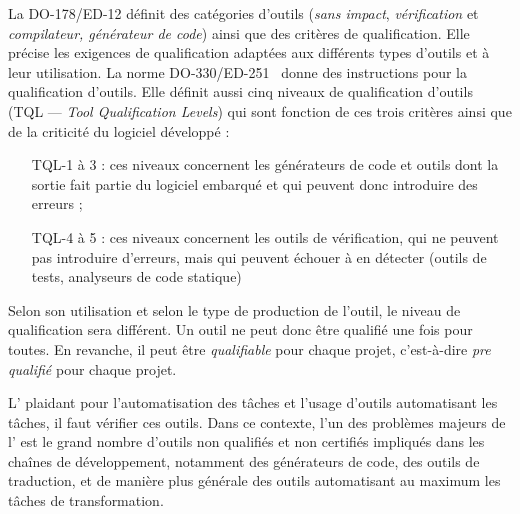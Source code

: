La DO-178/ED-12 définit des catégories d'outils (\emph{sans impact},
\emph{vérification} et \emph{compilateur, générateur de code}) ainsi que des
critères de qualification. Elle précise les exigences de qualification adaptées
aux différents types d'outils et à leur utilisation. La norme
DO-330/ED-251~\cite{DO-330} donne des instructions pour la qualification
d'outils. Elle définit aussi cinq niveaux de qualification d'outils (TQL ---
\emph{Tool Qualification Levels}) qui sont fonction de ces trois critères ainsi
que de la criticité du logiciel développé :
\begin{enumerate}

  \item[TQL-1 à 3 : ] ces niveaux concernent les générateurs de code et outils
    dont la sortie fait partie du logiciel embarqué et qui peuvent donc
    introduire des erreurs ;
  
  \item[TQL-4 à 5 : ] ces niveaux concernent les outils de vérification, qui ne
    peuvent pas introduire d'erreurs, mais qui peuvent échouer à en détecter
    (outils de tests, analyseurs de code statique)

\end{enumerate}

Selon son utilisation et selon le type de production de l'outil, le niveau de
qualification sera différent. Un outil ne peut donc être qualifié une fois pour
toutes. En revanche, il peut être \emph{qualifiable} pour chaque projet,
c'est-à-dire \emph{pre qualifié} pour chaque projet.


L'{\idm} plaidant pour l'automatisation des tâches et l'usage d'outils
automatisant les tâches, il faut vérifier ces outils. Dans ce contexte, l'un
des problèmes majeurs de l'{\idm} est le grand nombre d'outils  non qualifiés
et non certifiés impliqués dans les chaînes de développement, notamment des
générateurs de code, des outils de traduction, et de manière plus générale des
outils automatisant au maximum les tâches de transformation. 






